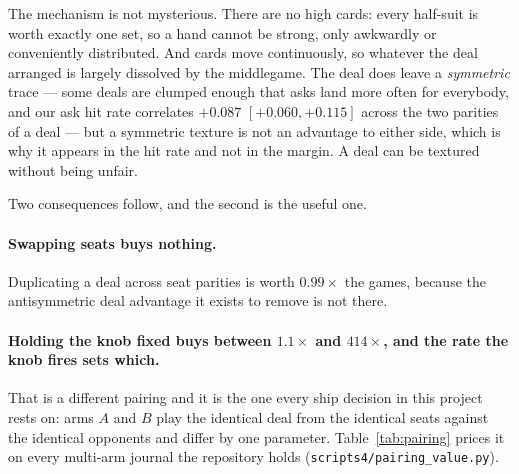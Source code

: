 \documentclass[11pt,a4paper]{article}
\begin{document}
The mechanism is not mysterious. There are no high cards: every half-suit is
worth exactly one set, so a hand cannot be strong, only awkwardly or
conveniently distributed. And cards move continuously, so whatever the deal
arranged is largely dissolved by the middlegame. The deal does leave a
\emph{symmetric} trace --- some deals are clumped enough that asks land more
often for everybody, and our ask hit rate correlates $+0.087$
$[+0.060, +0.115]$ across the two parities of a deal --- but a symmetric
texture is not an advantage to either side, which is why it appears in the hit
rate and not in the margin. A deal can be textured without being unfair.

Two consequences follow, and the second is the useful one.

\paragraph{Swapping seats buys nothing.} Duplicating a deal across seat
parities is worth $0.99\times$ the games, because the antisymmetric deal
advantage it exists to remove is not there.

\paragraph{Holding the knob fixed buys between $1.1\times$ and $414\times$, and
the rate the knob fires sets which.} That is a different pairing and it is the
one every ship decision in this project rests on: arms $A$ and $B$ play the
identical deal from the identical seats against the identical opponents and
differ by one parameter. Table~\ref{tab:pairing} prices it on every multi-arm
journal the repository holds (\texttt{scripts4/pairing\_value.py}).
\end{document}
